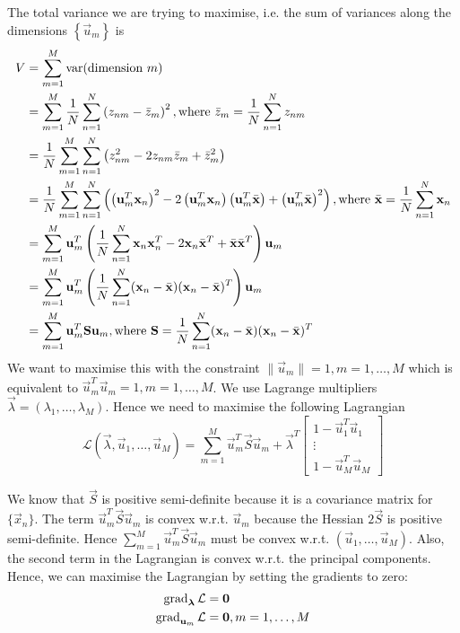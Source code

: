 The total variance we are trying to maximise, i.e. the sum of variances along the dimensions $\left\{\vec u_m\right\}$ is
\begin{align*}
    V   &= \sum_{m = 1}^M \operatorname{\mathrm{var}}(\text{dimension } m) \\
        &= \sum_{m = 1}^M \frac{1}{N} \sum_{n = 1}^N \left( z_{nm} - \bar{z}_m \right)^2, \text{where } \bar{z}_m = \frac{1}{N} \sum_{n = 1}^N z_{nm} \\
        &= \frac{1}{N} \sum_{m = 1}^M \sum_{n = 1}^N \left( z_{nm}^2 - 2 z_{nm} \bar z_m + \bar z_m^2 \right) \\
        &= \frac{1}{N} \sum_{m = 1}^M \sum_{n = 1}^N \left( \left(\boldsymbol{\mathbf{u}}_m^T \boldsymbol{\mathbf{x}}_n \right)^2 - 2 \left(\boldsymbol{\mathbf{u}}_m^T \boldsymbol{\mathbf{x}}_n\right) \left(\boldsymbol{\mathbf{u}}_m^T \bar{\boldsymbol{\mathbf{x}}}\right) + \left( \boldsymbol{\mathbf{u}}_m^T \bar{\boldsymbol{\mathbf{x}}} \right)^2 \right), \text{where } \bar{\boldsymbol{\mathbf{x}}} = \frac{1}{N} \sum_{n = 1}^N \boldsymbol{\mathbf{x}}_n \\
        &= \sum_{m = 1}^M \boldsymbol{\mathbf{u}}_m^T \left( \frac{1}{N} \sum_{n = 1}^N \boldsymbol{\mathbf{x}}_n \boldsymbol{\mathbf{x}}_n^T - 2 \boldsymbol{\mathbf{x}}_n \bar{\boldsymbol{\mathbf{x}}}^T + \bar{\boldsymbol{\mathbf{x}}} \bar{\boldsymbol{\mathbf{x}}}^T \right) \boldsymbol{\mathbf{u}}_m \\
        &= \sum_{m = 1}^M \boldsymbol{\mathbf{u}}_m^T \left( \frac{1}{N} \sum_{n = 1}^N (\boldsymbol{\mathbf{x}}_n - \bar{\boldsymbol{\mathbf{x}}})(\boldsymbol{\mathbf{x}}_n - \bar{\boldsymbol{\mathbf{x}}})^T \right) \boldsymbol{\mathbf{u}}_m \\
        &= \sum_{m = 1}^M \boldsymbol{\mathbf{u}}_m^T \boldsymbol{\mathbf{S}} \boldsymbol{\mathbf{u}}_m, \text{where } \boldsymbol{\mathbf{S}} = \frac{1}{N} \sum_{n = 1}^N (\boldsymbol{\mathbf{x}}_n - \bar{\boldsymbol{\mathbf{x}}})(\boldsymbol{\mathbf{x}}_n - \bar{\boldsymbol{\mathbf{x}}})^T
\end{align*}
We want to maximise this with the constraint $\|\vec u_m\| = 1, m = 1, \dotsc, M$ which is equivalent to $\vec u_m^T \vec u_m = 1, m = 1, \dotsc, M$. We use Lagrange multipliers $\vec \lambda = (\lambda_1, \dotsc, \lambda_M)$. Hence we need to maximise the following Lagrangian
\begin{equation*}
    \mathcal L(\vec \lambda, \vec u_1, \dotsc, \vec u_M) = \sum_{m = 1}^M \vec u_m^T \vec S \vec u_m + \vec \lambda^T
        \begin{bmatrix}
            1 - \vec u_1^T \vec u_1 \\
            \vdots \\
            1 - \vec u_M^T \vec u_M
        \end{bmatrix}
\end{equation*}

We know that $\vec S$ is positive semi-definite because it is a covariance matrix for $\{\vec x_n\}$. The term $\vec u_m^T \vec S \vec u_m$ is convex w.r.t. $\vec u_m$ because the Hessian $2 \vec S$ is positive semi-definite. Hence $\sum_{m = 1}^M \vec u_m^T \vec S \vec u_m$ must be convex w.r.t. $(\vec u_1, \dotsc, \vec u_M)$. Also, the second term in the Lagrangian is convex w.r.t. the principal components. Hence, we can maximise the Lagrangian by setting the gradients to zero:
\begin{align}
    \operatorname{\mathrm{grad}}_{\boldsymbol{\mathbf{\lambda}}}{\mathcal L}    &= \boldsymbol{\mathbf{0}} \label{eqn:gradLambda}\\
    \operatorname{\mathrm{grad}}_{\boldsymbol{\mathbf{u}}_m}{\mathcal L}        &= \boldsymbol{\mathbf{0}}, m = 1, \dotsc, M \label{eqn:gradU}
\end{align}

